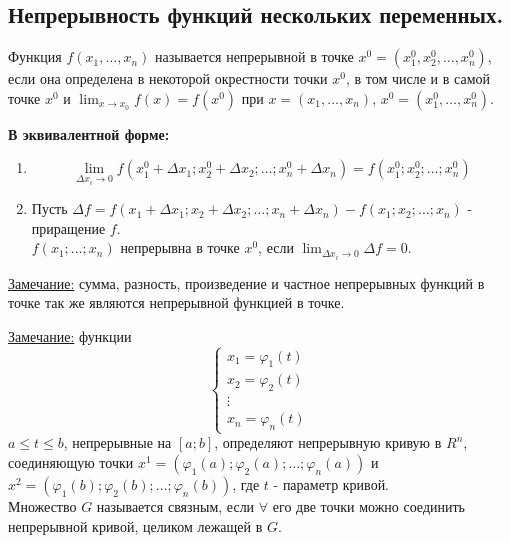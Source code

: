 \documentclass[12pt]{article}
\begin{document}
    \subsection{Непрерывность функций нескольких переменных.}
    Функция $f(x_1, \dots, x_n)$ называется непрерывной в точке $x^0 = (x^0_1, x^0_2, \dots, x^0_n)$, если она определена в некоторой окрестности точки $x^0$, в том числе и в самой точке $x^0$ и $\lim_{x \to x_0} f(x) = f(x^0)$ при $x = (x_1, \dots, x_n)$, $x^0 = (x^0_1, \dots, x^0_n)$.\par\noindent
    \textbf{В эквивалентной форме:}
    \begin{enumerate}
        \item \[ \lim_{\Delta x_i \to 0} f(x^0_1 + \Delta x_1; x^0_2 + \Delta x_2; \dots; x^0_n + \Delta x_n) = f(x^0_1; x^0_2; \dots; x^0_n) \]
        \item Пусть $\Delta f = f(x_1 + \Delta x_1; x_2 + \Delta x_2; \dots; x_n + \Delta x_n) - f(x_1; x_2; \dots; x_n)$ - приращение $f$.\\
        $f(x_1; \dots; x_n)$ непрерывна в точке $x^0$, если $\lim_{\Delta x_i \to 0}\Delta f = 0$.
    \end{enumerate}
    \underline{Замечание:} сумма, разность, произведение и частное непрерывных функций в точке так же являются непрерывной функцией в точке.\par\noindent
    \underline{Замечание:} функции
    \[ \begin{cases}
        x_1 = \varphi_1(t)\\
        x_2 = \varphi_2(t)\\
        \vdots\\
        x_n = \varphi_n(t)
    \end{cases} \]
    $a \le t \le b$, непрерывные на $[a;b]$, определяют непрерывную кривую в $R^n$, соединяющую точки $x^1 = (\varphi_1(a); \varphi_2(a); \dots; \varphi_n(a))$ и $x^2 = (\varphi_1(b); \varphi_2(b); \dots; \varphi_n(b))$, где $t$ - параметр кривой.\\
    Множество $G$ называется связным, если $\forall$ его две точки можно соединить непрерывной кривой, целиком лежащей в $G$.
    
\end{document}
